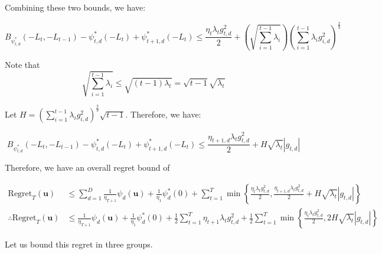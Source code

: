 \documentclass{article}
\newcommand{\Regret}{\text{Regret}}
\newcommand{\bu}{\mathbf{u}}
\begin{document}
Combining these two bounds, we have:

\[
  B_{\psi_{t,d}^*}(-L_t, -L_{t-1}) - \psi_{t,d}^*(-L_t) + \psi_{t+1,d}^*(-L_t) \leq \frac{\eta_t \lambda_t g_{t,d}^2}{2}
  + \left(\sqrt{\sum_{i=1}^{t-1} \lambda_i}\right)\left(\sum_{i=1}^{t-1}\lambda_i g_{i,d}^2\right)^\frac{2}{3}
\]

Note that 
\[
  \sqrt{\sum\limits_{i=1}^{t-1}\lambda_i} \leq \sqrt{(t-1) \lambda_t} = \sqrt{t-1}\sqrt{\lambda_t}
\]

Let $H = \left(\sum\limits_{i=1}^{t-1} \lambda_i g_{i,d}^2\right)^\frac{2}{3} \sqrt{t-1}$. Therefore, we have:

\[
  B_{\psi_{t,d}^*}(-L_{t}, -L_{t-1}) - \psi_{t,d}^*(-L_t) + \psi_{t+1,d}^*(-L_t) \leq \frac{\eta_{t+1,d} \lambda_t
  g_{t,d}^2}{2} + H \sqrt{\lambda_t}|g_{t,d}|
\]

Therefore, we have an overall regret bound of

\begin{align}
  \Regret_T(\bu) 
  &\leq \sum\limits_{d=1}^D \frac{1}{\eta_{T+1}}\psi_{d}(\bu) + \frac{1}{\eta_1}\psi_{d}^*(0)+\sum\limits_{t=1}^T \min
  \left\{\frac{\eta_t \lambda_t g_{t,d}^2}{2}, \frac{\eta_{t+1,d} \lambda_t g_{t,d}^2}{2} + H
  \sqrt{\lambda_t}|g_{t,d}|\right\} \nonumber \\
  \therefore \Regret_T(\bu) 
  &\leq \frac{1}{\eta_{T+1}}\psi_{d}(\bu) + \frac{1}{\eta_1}\psi_{d}^*(0)+\frac{1}{2}\sum\limits_{t=1}^T \eta_{t+1}
  \lambda_t g_{t,d}^2 + \frac{1}{2}\sum\limits_{t=1}^T \min \left\{\frac{\eta_t \lambda_t g_{t,d}^2}{2},  2H
  \sqrt{\lambda_t}|g_{t,d}|\right\} \label{eq:1}
\end{align}

Let us bound this regret in three groups.
\end{document}
